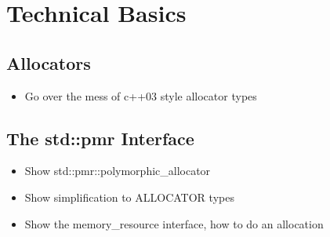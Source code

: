 \section{Technical Basics}

\subsection{Allocators}

\begin{itemize}
\item Go over the mess of c++03 style allocator types
\end{itemize}


\subsection{The std::pmr Interface}

\begin{itemize}
\item Show std::pmr::polymorphic_allocator
\item Show simplification to ALLOCATOR types
\item Show the memory_resource interface, how to do an allocation
\end{itemize}


